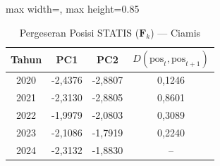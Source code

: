 \begin{table}[H]
\centering
\caption{Pergeseran Posisi STATIS ($\mathbf{F}_k$) --- Ciamis} \label{tab:app1jarak_statis_skor_ciamis}
\begin{adjustbox}{max width=\textwidth, max height=0.85\textheight}
\begin{tabular}{|c|c|c|c|}
\hline
\textbf{Tahun} & \textbf{PC1} & \textbf{PC2} & \textbf{$D(\text{pos}_t, \text{pos}_{t+1})$} \\
\hline
2020 & -2,4376 & -2,8807 & 0,1246 \\
2021 & -2,3130 & -2,8805 & 0,8601 \\
2022 & -1,9979 & -2,0803 & 0,3089 \\
2023 & -2,1086 & -1,7919 & 0,2240 \\
2024 & -2,3132 & -1,8830 & -- \\
\hline
\end{tabular}
\end{adjustbox}
\end{table}